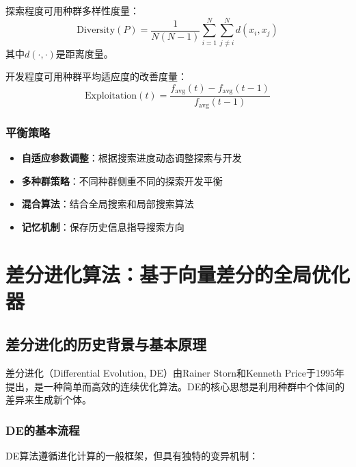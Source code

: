 探索程度可用种群多样性度量：
\[
\text{Diversity}(P) = \frac{1}{N(N-1)} \sum_{i=1}^N \sum_{j\neq i}^N d(x_i, x_j)
\]
其中$d(\cdot,\cdot)$是距离度量。

开发程度可用种群平均适应度的改善度量：
\[
\text{Exploitation}(t) = \frac{f_{\text{avg}}(t) - f_{\text{avg}}(t-1)}{f_{\text{avg}}(t-1)}
\]

\subsubsection{平衡策略}

\begin{itemize}
    \item \textbf{自适应参数调整}：根据搜索进度动态调整探索与开发
    \item \textbf{多种群策略}：不同种群侧重不同的探索开发平衡
    \item \textbf{混合算法}：结合全局搜索和局部搜索算法
    \item \textbf{记忆机制}：保存历史信息指导搜索方向
\end{itemize}

\section{差分进化算法：基于向量差分的全局优化器}

\subsection{差分进化的历史背景与基本原理}

差分进化（Differential Evolution, DE）由Rainer Storn和Kenneth Price于1995年提出，是一种简单而高效的连续优化算法。DE的核心思想是利用种群中个体间的差异来生成新个体。

\subsubsection{DE的基本流程}

DE算法遵循进化计算的一般框架，但具有独特的变异机制：

